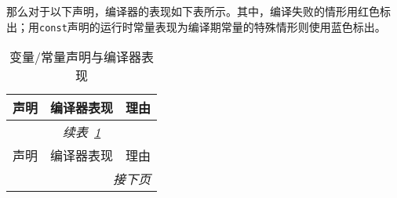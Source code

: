 \documentclass[../main.tex]{subfiles}
\begin{document}
那么对于以下声明，编译器的表现如下表所示。其中，编译失败的情形用红色标出；用\texttt{const}声明的运行时常量表现为编译期常量的特殊情形则使用蓝色标出。
\begin{small}            %
\begin{longtable}[c]{l|ll}
  \caption{变量/常量声明与编译器表现}
  \label{tab:long}\\
  \toprule
  声明 & 编译器表现 & 理由 \\
  \midrule
  \endfirsthead          %

  \multicolumn{3}{c}{\footnotesize\itshape 续表~\ref{tab:long}}\\[.5ex]
  \toprule
  声明 & 编译器表现 & 理由 \\
  \midrule
  \endhead               %

  \midrule
  \multicolumn{3}{r}{\footnotesize\itshape 接下页}
  \endfoot               %

  \bottomrule
  \endlastfoot           %


\end{longtable}
\end{small}
\end{document}
